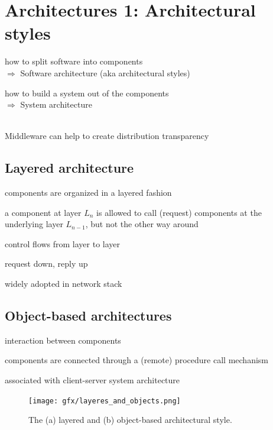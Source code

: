 \documentclass[ngerman,a4paper]{report}
\begin{document}
\chapter{Architectures 1: Architectural styles}

\begin{compactitem}
\item how to split software into components\\
$\Rightarrow$ Software architecture (aka architectural styles)
\item how to build a system out of the components\\
$\Rightarrow$ System architecture
\end{compactitem}
\ \\
Middleware can  help to create distribution transparency

\section{Layered architecture}

\begin{compactitem}
	\item components are organized in a layered fashion
	\item a component at layer $L_n$ is allowed to call (request) components at the underlying layer $L_{n-1}$, but not the other way around
	\item control flows from layer to layer
	\item request down, reply up
	\item widely adopted in network stack
\end{compactitem}

\section{Object-based architectures}

\begin{compactitem}
	\item interaction between components
	\item components are connected through a (remote) procedure call mechanism
	\item associated with client-server system architecture
\end{compactitem}


\begin{figure}[h]
	\centering
	\texttt{[image: gfx/layeres\_and\_objects.png]}
	\caption{The (a) layered and (b) object-based architectural style.}
	\label{img:layeres_and_objects}
\end{figure}
\end{document}
